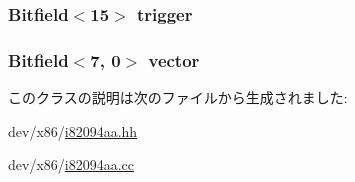 \label{classX86ISA_1_1I82094AA_a91847c8f9fbbd5be70da8e6af01b26bb}
\hypertarget{classX86ISA_1_1I82094AA_a1a8acf21e383afeb477a3d8e88b689de}{
\subsubsection[{trigger}]{\setlength{\rightskip}{0pt plus 5cm}Bitfield$<$15$>$ {\bf trigger}}}
\label{classX86ISA_1_1I82094AA_a1a8acf21e383afeb477a3d8e88b689de}
\hypertarget{classX86ISA_1_1I82094AA_a8b9597b04839779d67912b193653be20}{
\subsubsection[{vector}]{\setlength{\rightskip}{0pt plus 5cm}Bitfield$<$7, 0$>$ {\bf vector}}}
\label{classX86ISA_1_1I82094AA_a8b9597b04839779d67912b193653be20}


このクラスの説明は次のファイルから生成されました:\begin{DoxyCompactItemize}
\item 
dev/x86/\hyperlink{i82094aa_8hh}{i82094aa.hh}\item 
dev/x86/\hyperlink{i82094aa_8cc}{i82094aa.cc}\end{DoxyCompactItemize}

